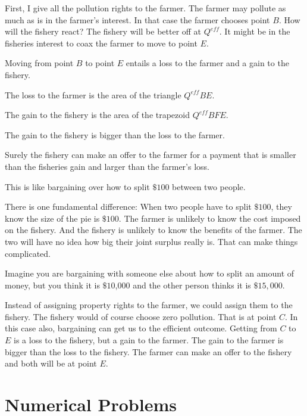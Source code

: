 \documentclass[
]{book}
\begin{document}
First, I give all the pollution rights to the farmer. The farmer may pollute as much as is in the farmer's interest. In that case the farmer chooses point \(B\). How will the fishery react? The fishery will be better off at \(Q^{eff}\). It might be in the fisheries interest to coax the farmer to move to point \(E\).

Moving from point \(B\) to point \(E\) entails a loss to the farmer and a gain to the fishery.

The loss to the farmer is the area of the triangle \(Q^{eff}BE\).

The gain to the fishery is the area of the trapezoid \(Q^{eff}BFE\).

The gain to the fishery is bigger than the loss to the farmer.

Surely the fishery can make an offer to the farmer for a payment that is smaller than the fisheries gain and larger than the farmer's loss.

This is like bargaining over how to split \(\$100\) between two people.

There is one fundamental difference: When two people have to split \(\$100\), they know the size of the pie is \(\$100\). The farmer is unlikely to know the cost imposed on the fishery. And the fishery is unlikely to know the benefits of the farmer. The two will have no idea how big their joint surplus really is. That can make things complicated.

Imagine you are bargaining with someone else about how to split an amount of money, but you think it is \(\$10\),000 and the other person thinks it is \(\$15,000\).

Instead of assigning property rights to the farmer, we could assign them to the fishery. The fishery would of course choose zero pollution. That is at point \(C\). In this case also, bargaining can get us to the efficient outcome. Getting from \(C\) to \(E\) is a loss to the fishery, but a gain to the farmer. The gain to the farmer is bigger than the loss to the fishery. The farmer can make an offer to the fishery and both will be at point \(E\).

\hypertarget{numerical-problems}{%
\section{Numerical Problems}\label{numerical-problems}}
\end{document}
